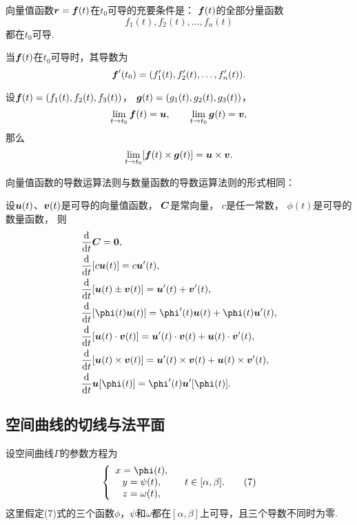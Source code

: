\begin{theorem}
向量值函数\(\boldsymbol{r}=\boldsymbol{f}(t)\)在\(t_0\)可导的充要条件是：
\(\boldsymbol{f}(t)\)的全部分量函数\[
f_1(t),f_2(t),\dotsc,f_n(t)
\]都在\(t_0\)可导.
\end{theorem}

\begin{theorem}
当\(\boldsymbol{f}(t)\)在\(t_0\)可导时，其导数为
\begin{equation}
	\boldsymbol{f}'(t_0)
	= (f_1'(t),f_2'(t),\dotsc,f_n'(t)).
\end{equation}
\end{theorem}

\begin{theorem}
设\(\boldsymbol{f}(t) = (f_1(t),f_2(t),f_3(t))\)，
\(\boldsymbol{g}(t) = (g_1(t),g_2(t),g_3(t))\)，
\[
	\lim\limits_{t \to t_0} \boldsymbol{f}(t) = \boldsymbol{u},
	\qquad
	\lim\limits_{t \to t_0} \boldsymbol{g}(t) = \boldsymbol{v},
\]
那么\[
	\lim\limits_{t \to t_0} [\boldsymbol{f}(t) \times \boldsymbol{g}(t)]
	= \boldsymbol{u} \times \boldsymbol{v}.
\]
\end{theorem}

向量值函数的导数运算法则与数量函数的导数运算法则的形式相同：
\begin{theorem}[向量值函数的导数运算法则]
设\(\boldsymbol{u}(t)\)、\(\boldsymbol{v}(t)\)是可导的向量值函数，
\(\boldsymbol{C}\)是常向量，
\(c\)是任一常数，
\(\phi(t)\)是可导的数量函数，
则\begin{align}
	&\dv{t} \vb{C}
		= \vb{0}, \\
	&\dv{t} [c \vb{u}(t)]
		= c \vb{u}'(t), \\
	&\dv{t} [\vb{u}(t) \pm \vb{v}(t)]
		= \vb{u}'(t) + \vb{v}'(t), \\
	&\dv{t} [\phi(t) \vb{u}(t)]
		= \phi'(t) \vb{u}(t) + \phi(t) \vb{u}'(t), \\
	&\dv{t} [\vb{u}(t) \cdot \vb{v}(t)]
		= \vb{u}'(t) \cdot \vb{v}(t) + \vb{u}(t) \cdot \vb{v}'(t), \\
	&\dv{t} [\vb{u}(t) \times \vb{v}(t)]
		= \vb{u}'(t) \times \vb{v}(t) + \vb{u}(t) \times \vb{v}'(t), \\
	&\dv{t} \vb{u}[\phi(t)]
		= \phi'(t) \vb{u}'[\phi(t)].
\end{align}
\end{theorem}

\subsection{空间曲线的切线与法平面}
设空间曲线\(\Gamma\)的参数方程为\begin{gather}
\left\{ \begin{array}{c}
x = \phi(t), \\
y = \psi(t), \\
z = \omega(t), \\
\end{array} \right.
\quad
t \in [\alpha,\beta].
\tag7
\end{gather}这里假定(7)式的三个函数\(\phi\)，\(\psi\)和\(\omega\)都在\([\alpha,\beta]\)上可导，且三个导数不同时为零.

